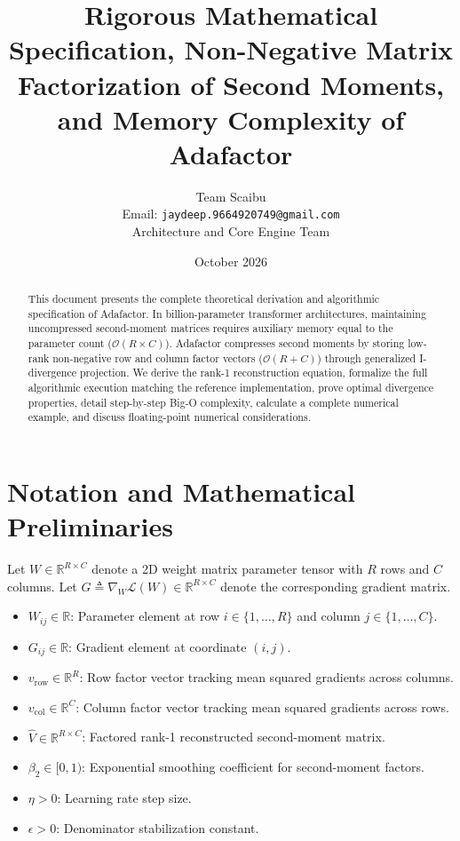 \documentclass[11pt,a4paper]{article}
\title{\textbf{Rigorous Mathematical Specification, Non-Negative Matrix Factorization of Second Moments, and Memory Complexity of Adafactor}}
\author{Team Scaibu \\ \small Email: \texttt{jaydeep.9664920749@gmail.com} \\ \small Architecture and Core Engine Team}
\date{October 2026}
\theoremstyle{definition}
\begin{document}
\maketitle

\begin{abstract}
This document presents the complete theoretical derivation and algorithmic specification of Adafactor. In billion-parameter transformer architectures, maintaining uncompressed second-moment matrices requires auxiliary memory equal to the parameter count ($\mathcal{O}(R \times C)$). Adafactor compresses second moments by storing low-rank non-negative row and column factor vectors ($\mathcal{O}(R + C)$) through generalized I-divergence projection. We derive the rank-1 reconstruction equation, formalize the full algorithmic execution matching the reference implementation, prove optimal divergence properties, detail step-by-step Big-O complexity, calculate a complete numerical example, and discuss floating-point numerical considerations.
\end{abstract}

\section{Notation and Mathematical Preliminaries}

Let $W \in \mathbb{R}^{R \times C}$ denote a 2D weight matrix parameter tensor with $R$ rows and $C$ columns. Let $G \triangleq \nabla_W \mathcal{L}(W) \in \mathbb{R}^{R \times C}$ denote the corresponding gradient matrix.

\begin{itemize}
    \item $W_{ij} \in \mathbb{R}$: Parameter element at row $i \in \{1, \dots, R\}$ and column $j \in \{1, \dots, C\}$.
    \item $G_{ij} \in \mathbb{R}$: Gradient element at coordinate $(i, j)$.
    \item $v_{\text{row}} \in \mathbb{R}^R$: Row factor vector tracking mean squared gradients across columns.
    \item $v_{\text{col}} \in \mathbb{R}^C$: Column factor vector tracking mean squared gradients across rows.
    \item $\hat{V} \in \mathbb{R}^{R \times C}$: Factored rank-1 reconstructed second-moment matrix.
    \item $\beta_2 \in [0, 1)$: Exponential smoothing coefficient for second-moment factors.
    \item $\eta > 0$: Learning rate step size.
    \item $\epsilon > 0$: Denominator stabilization constant.
\end{itemize}
\end{document}
